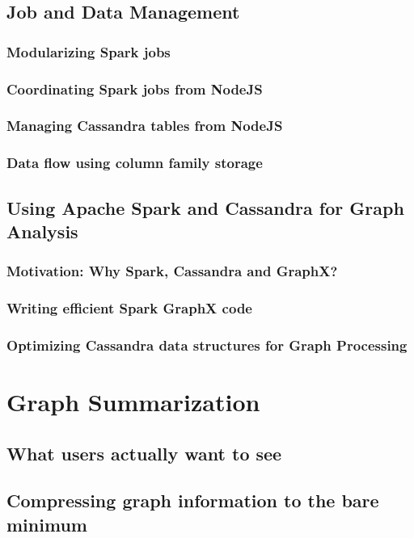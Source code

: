 \documentclass[
        a4paper,     %
        titlepage,   %
        twoside,     %
        parskip      %
        ]{scrartcl}  %
\begin{document}
    \subsection{Job and Data Management}
      \subsubsection{Modularizing Spark jobs}
      \subsubsection{Coordinating Spark jobs from NodeJS}
      \subsubsection{Managing Cassandra tables from NodeJS}
      \subsubsection{Data flow using column family storage}
    \subsection{Using Apache Spark and Cassandra for Graph Analysis}
      \subsubsection{Motivation: Why Spark, Cassandra and GraphX?}
      \subsubsection{Writing efficient Spark GraphX code}
      \subsubsection{Optimizing Cassandra data structures for Graph Processing}
    \pagebreak

  \section{Graph Summarization}
    \subsection{What users actually want to see}
    \subsection{Compressing graph information to the bare minimum}
\end{document}
